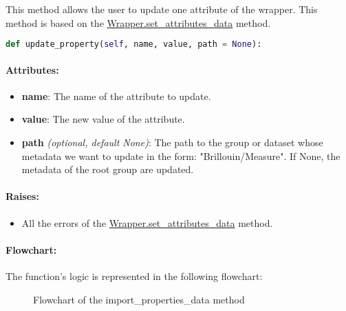 This method allows the user to update one attribute of the wrapper. This method is based on the \hyperref[subsec:wrapper.set_attributes_data]{Wrapper.set\_attributes\_data} method.

\begin{lstlisting}[language=Python]
def update_property(self, name, value, path = None):
\end{lstlisting}

\paragraph{Attributes:}

\begin{itemize}
    \item \textbf{name}: The name of the attribute to update.
    \item \textbf{value}: The new value of the attribute.
    \item \textbf{path} \textit{(optional, default None)}: The path to the group or dataset whose metadata we want to update in the form: "Brillouin/Measure". If None, the metadata of the root group are updated.
\end{itemize}

\paragraph{Raises:}
\begin{itemize}
    \item All the errors of the \hyperref[subsec:wrapper.set_attributes_data]{Wrapper.set\_attributes\_data} method.
\end{itemize}


\paragraph{Flowchart:}

The function's logic is represented in the following flowchart:
\begin{figure}[H]
    \centering
    \label{fig:wrapper.flowchart_update_property}
    \small
    \caption{Flowchart of the import\_properties\_data method}
\end{figure}